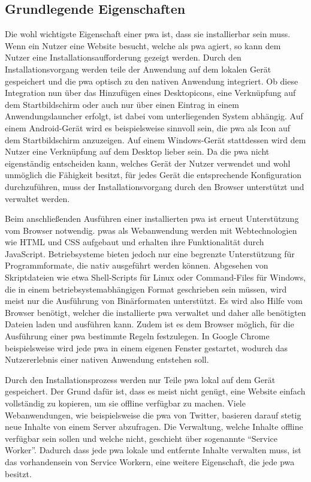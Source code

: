 \documentclass[12pt, parskip=half]{scrartcl}       %
\begin{document}
\subsection{Grundlegende Eigenschaften}

Die wohl wichtigste Eigenschaft einer \ac{pwa} ist, dass sie installierbar sein muss.
Wenn ein Nutzer eine Website besucht, welche als \ac{pwa} agiert, so kann dem Nutzer eine Installationsaufforderung gezeigt werden.
Durch den Installationsvorgang werden teile der Anwendung auf dem lokalen Gerät gespeichert und die \ac{pwa} optisch zu den nativen Anwendung integriert.
Ob diese Integration nun über das Hinzufügen eines Desktopicons, eine Verknüpfung auf dem Startbildschirm oder auch nur über einen Eintrag in einem Anwendungslauncher erfolgt, ist dabei vom unterliegenden System abhängig.
Auf einem Android-Gerät wird es beispielsweise sinnvoll sein, die \ac{pwa} als Icon auf dem Startbildschirm anzuzeigen.
Auf einem Windows-Gerät stattdessen wird dem Nutzer eine Verknüpfung auf dem Desktop lieber sein.
Da die \ac{pwa} nicht eigenständig entscheiden kann, welches Gerät der Nutzer verwendet und wohl unmöglich die Fähigkeit besitzt, für jedes Gerät die entsprechende Konfiguration durchzuführen, muss der Installationsvorgang durch den Browser unterstützt und verwaltet werden.

Beim anschließenden Ausführen einer installierten \ac{pwa} ist erneut Unterstützung vom Browser notwendig.
\acp{pwa} als Webanwendung werden mit Webtechnologien wie HTML und CSS aufgebaut und erhalten ihre Funktionalität durch JavaScript.
Betriebsysteme bieten jedoch nur eine begrenzte Unterstützung für Programmformate, die nativ ausgeführt werden können.
Abgesehen von Skriptdateien wie etwa Shell-Scripts für Linux oder Command-Files für Windows, die in einem betriebsystemabhängigen Format geschrieben sein müssen, wird meist nur die Ausführung von Binärformaten unterstützt\cite{fisher_executablelist}.
Es wird also Hilfe vom Browser benötigt, welcher die installierte \ac{pwa} verwaltet und daher alle benötigten Dateien laden und ausführen kann.
Zudem ist es dem Browser möglich, für die Ausführung einer \ac{pwa} bestimmte Regeln festzulegen.
In Google Chrome beispielsweise wird jede \ac{pwa} in einem eigenen Fenster gestartet, wodurch das Nutzererlebnis einer nativen Anwendung entstehen soll\cite{googledevs_pwa}.


Durch den Installationsprozess werden nur Teile \ac{pwa} lokal auf dem Gerät gespeichert.
Der Grund dafür ist, dass es meist nicht genügt, eine Website einfach vollständig zu kopieren, um sie offline verfügbar zu machen.
Viele Webanwendungen, wie beispielsweise die \ac{pwa} von Twitter\cite{twitter_pwa}, basieren darauf stetig neue Inhalte von einem Server abzufragen.
Die Verwaltung, welche Inhalte offline verfügbar sein sollen und welche nicht, geschieht über sogenannte \enquote{Service Worker}.
Dadurch dass jede \ac{pwa} lokale und entfernte Inhalte verwalten muss, ist das vorhandensein von Service Workern, eine weitere Eigenschaft, die jede \ac{pwa} besitzt.
\end{document}
